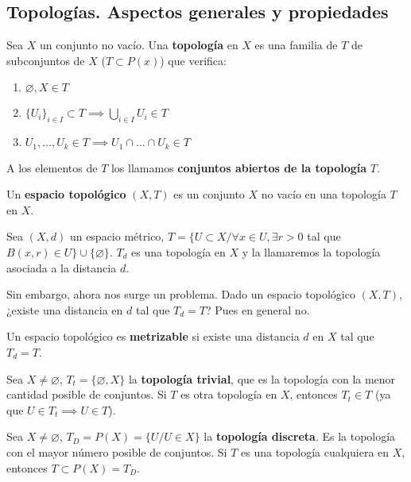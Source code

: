 \subsection{Topologías. Aspectos generales y propiedades}
\begin{ndef}[Topología]
  Sea $X$ un conjunto no vacío. Una \textbf{topología} en $X$ es una familia de $T$ de subconjuntos de $X$ ($T \subset P(x)$) que verifica:
  \begin{enumerate}
    \item $\varnothing ,X \in T$
    \item $\{U_i\}_{i \in I} \subset T \implies \bigcup_{i \in I} U_i \in T$
    \item $U_1,\ldots,U_k \in T \implies U_1 \cap \ldots \cap U_k \in T$
  \end{enumerate}
\end{ndef}
\begin{note}
    A los elementos de $T$ los llamamos \textbf{conjuntos abiertos de la topología} $T$.
\end{note}
\begin{ndef}
  Un \textbf{espacio topológico} $(X,T)$ es un conjunto $X$ no vacío en una topología $T$ en $X$.
\end{ndef}
\begin{exmp}
  Sea $(X,d)$ un espacio métrico, $T=\{U \subset  X / \forall x \in U, \exists r>0$ tal que $B(x,r) \in U\} \cup \{\varnothing \}$. $T_d$ es una topología en $X$ y la llamaremos la topología asociada a la distancia $d$.
\end{exmp}
Sin embargo, ahora nos surge un problema. Dado un espacio topológico $(X,T)$, ¿existe una distancia en $d$ tal que $T_d=T$? Pues en general no.
\begin{ndef}
  Un espacio topológico es \textbf{metrizable} si existe una distancia $d$ en $X$ tal que $T_d=T$.
\end{ndef}
\begin{exmp}
  Sea $X \neq \varnothing $, $T_t=\{\varnothing ,X\}$ la \textbf{topología trivial}, que es la topología con la menor cantidad posible de conjuntos. Si $T$ es otra topología en $X$, entonces $T_t \in T$ (ya que $U \in T_t \implies U \in T$).
\end{exmp}
\begin{exmp}
  Sea $X \neq \varnothing $, $T_D = P(X) = \{U / U \in X\}$ la \textbf{topología discreta}. Es la topología con el mayor número posible de conjuntos. Si $T$ es una topología cualquiera en $X$, entonces $T \subset P(X)=T_D$.
\end{exmp}
